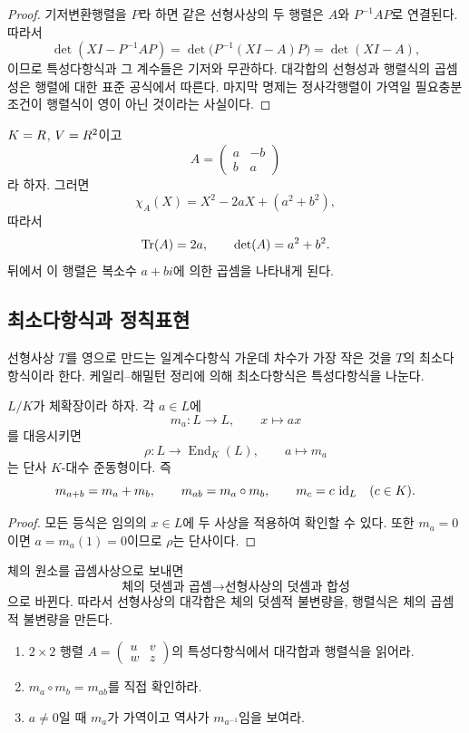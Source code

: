 \begin{proof}
기저변환행렬을 $P$라 하면 같은 선형사상의 두 행렬은 $A$와
$P^{-1}AP$로 연결된다. 따라서
\[
  \det(XI-P^{-1}AP)
  =\det\bigl(P^{-1}(XI-A)P\bigr)
  =\det(XI-A),
\]
이므로 특성다항식과 그 계수들은 기저와 무관하다. 대각합의 선형성과
행렬식의 곱셈성은 행렬에 대한 표준 공식에서 따른다. 마지막 명제는
정사각행렬이 가역일 필요충분조건이 행렬식이 영이 아닌 것이라는 사실이다.
\end{proof}

\begin{example}
$K=R$, $V=R^2$이고
\[
  A=
  \begin{pmatrix}
    a&-b\\
    b&a
  \end{pmatrix}
\]
라 하자. 그러면
\[
  \chi_A(X)=X^2-2aX+(a^2+b^2),
\]
따라서
\[
  \operatorname{Tr}(A)=2a,\qquad \det(A)=a^2+b^2.
\]
뒤에서 이 행렬은 복소수 $a+bi$에 의한 곱셈을 나타내게 된다.
\end{example}

\subsection{최소다항식과 정칙표현}

선형사상 $T$를 영으로 만드는 일계수다항식 가운데 차수가 가장 작은 것을
$T$의 최소다항식이라 한다. 케일리--해밀턴 정리에 의해 최소다항식은
특성다항식을 나눈다.

\begin{proposition}[곱셈 정칙표현]
\label{prop:regular-representation}
$L/K$가 체확장이라 하자. 각 $a\in L$에
\[
  m_a:L\longrightarrow L,\qquad x\longmapsto ax
\]
를 대응시키면
\[
  \rho:L\longrightarrow\operatorname{End}_K(L),
  \qquad a\longmapsto m_a
\]
는 단사 $K$-대수 준동형이다. 즉
\[
  m_{a+b}=m_a+m_b,\qquad
  m_{ab}=m_a\circ m_b,\qquad
  m_c=c\,\operatorname{id}_L\quad(c\in K).
\]
\end{proposition}

\begin{proof}
모든 등식은 임의의 $x\in L$에 두 사상을 적용하여 확인할 수 있다.
또한 $m_a=0$이면 $a=m_a(1)=0$이므로 $\rho$는 단사이다.
\end{proof}

\begin{keyidea}
체의 원소를 곱셈사상으로 보내면
\[
  \boxed{
  \text{체의 덧셈과 곱셈}
  \longrightarrow
  \text{선형사상의 덧셈과 합성}}
\]
으로 바뀐다. 따라서 선형사상의 대각합은 체의 덧셈적 불변량을,
행렬식은 체의 곱셈적 불변량을 만든다.
\end{keyidea}

\begin{checkpoint}
\begin{enumerate}[label=(\alph*)]
  \item $2\times2$ 행렬 $A=\begin{pmatrix}u&v\\w&z\end{pmatrix}$의
  특성다항식에서 대각합과 행렬식을 읽어라.
  \item $m_a\circ m_b=m_{ab}$를 직접 확인하라.
  \item $a\ne0$일 때 $m_a$가 가역이고 역사가 $m_{a^{-1}}$임을 보여라.
\end{enumerate}
\end{checkpoint}
